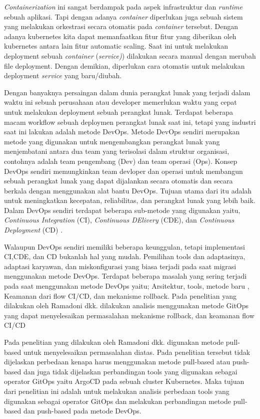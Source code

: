 \par
\textit{Containerization}\cite{davidbritch} ini sangat berdampak pada aspek infrastruktur dan \textit{runtime} sebuah aplikasi.
Tapi dengan adanya \textit{container} diperlukan juga sebuah  sistem yang melakukan orkestrasi secara otomatis pada \textit{container} tersebut.
Dengan  adanya kubernetes kita dapat memanfaatkan fitur fitur yang diberikan oleh kubernetes antara lain fitur automatic scaling\cite{Leila2018, kubernetes_2021}.
Saat ini untuk melakukan  deployment sebuah \textit{container} (\textit{service)}) dilakukan secara manual dengan merubah file deployment.
Dengan demikian, diperlukan cara otomatis untuk melakukan deployment \textit{service} yang baru/diubah.
\par
Dengan banyaknya persaingan dalam dunia perangkat lunak yang terjadi dalam waktu ini sebuah perusahaan
atau developer memerlukan waktu yang cepat untuk melakukan deployment sebuah perangkat lunak. Terdapat beberapa macam
workflow sebuah deploymen perangkat lunak saat ini, tetapi yang industri saat ini lakukan adalah metode DevOps.
Metode DevOps sendiri merupakan metode yang digunakan untuk mengembangkan perangkat lunak yang
menjembatani antara dua team yang terisolasi dalam struktur organisasi, contohnya adalah team pengembang (Dev)
dan team operasi (Ops)\cite{Bolscher2019}. Konsep DevOps sendiri memungkinkan team devloper dan operasi
untuk membangun sebuah perangkat lunak yang dapat dijalankan secara otomatis dan secara berkala dengan menggunakan alat bantu DevOps.
Tujuan utama dari itu adalah untuk meningkatkan kecepatan, reliabilitas, dan perangkat lunak yang lebih baik.
Dalam DevOps sendiri terdapat beberapa sub-metode yang digunakan yaitu, \textit{Continuous Integration} (CI), \textit{Continuous DElivery} (CDE),
dan \textit{Continuous Deployment} (CD) \cite{phoenix2013}.
\par
Walaupun DevOps sendiri memiliki beberapa keunggulan, tetapi implementasi CI,CDE, dan CD bukanlah hal yang mudah.
Pemilihan tools dan adaptasinya, adaptasi karyawan, dan miskonfigurasi yang biasa terjadi pada saat migrasi menggunakan metode DevOps.
\newpage
Terdapat beberapa masalah yang sering terjadi pada saat menggunakan metode DevOps yaitu; Arsitektur\cite{Bolscher2019},
tools\cite{Proulx2018}, metode baru \cite{Abbass2019, Leite2019}, Keamanan dari flow CI/CD\cite{Shahin2017}, dan mekanisme rollback\cite{Fritzsch2019}.
Pada penelitian yang dilakukan oleh Ramadoni dkk.\cite{Ramadoni2021} dilakukan analisis menggunakan metode GitOps
yang dapat menyelesaikan permasalahan mekanisme rollback, dan keamanan flow CI/CD
\par
Pada penelitian yang dilakukan oleh Ramadoni dkk.\cite{Ramadoni2021} digunakan metode pull-based untuk menyelesaikan permasalahan diatas. Pada penelitian tersebut tidak
dijelaskan perbedaan kenapa harus menggunakan metode pull-based atau push-based dan juga tidak dijelaskan
perbandingan tools yang digunakan sebagai operator GitOps yaitu ArgoCD pada sebuah cluster Kubernetes.
Maka tujuan dari penelitian ini adalah untuk melakukan analisis perbedaan tools yang digunakan
sebagai operator GitOps dan melakukan perbandingan metode pull-based dan push-based pada metode DevOps.

